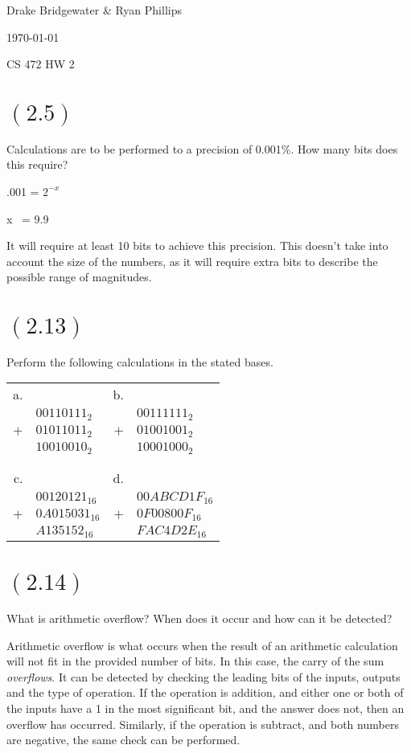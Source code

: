 \documentclass[letterpaper,12pt,titlepage]{article}
\def\name{Drake Bridgewater \& Ryan Phillips}
\begin{document}
\hfill \name

\hfill \today

\hfill CS 472 HW 2


\section*{$(2.5)$} Calculations are to be performed to a precision of 0.001\%. How many bits does this require?
  
.001 = $2^{-x}$

x ~= 9.9

It will require at least 10 bits to achieve this precision. This doesn't take into account the size of the numbers, as it will require extra bits to describe the possible range of magnitudes.

\section*{$(2.13)$} Perform the following calculations in the stated bases.

\begin{tabular}{r p{3cm}  r l}
a. 	&				& b. 	&					\\
	&	$00110111_{2}$ 		& 		& $00111111_{2}$   	\\
$+$ &	$01011011_{2}$ 		& $+$ 	& $01001001_{2}$	\\
\hline
	&	$10010010_{2}$ 		&  		& $10001000_{2}$	\\
 \\ \\
c. 	&				&d.	&					\\
	&	$00120121_{16}$		&  		& $00ABCD1F_{16}$ 	\\
$+$ &	$0A015031_{16}$ 	& $+$ 	& $0F00800F_{16}$ 	\\
\hline 
	&	$A135152_{16}$		&  		& $FAC4D2E_{16}$ 	\\
\end{tabular}


  
\section*{$(2.14)$} What is arithmetic overflow? When does it occur and how can it be detected?
  
Arithmetic overflow is what occurs when the result of an arithmetic calculation will not fit in the provided number of bits. In this case, the carry of the sum \textit{overflows}. It can be detected by checking the leading bits of the inputs, outputs and the type of operation. If the operation is addition, and either one or both of the inputs have a 1 in the most significant bit, and the answer does not, then an overflow has occurred. Similarly, if the operation is subtract, and both numbers are negative, the same check can be performed.
\end{document}
